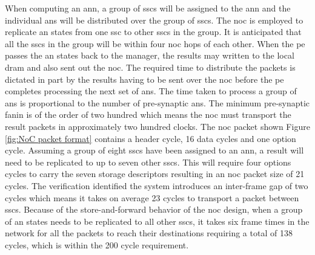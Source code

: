 When computing an \ac{ann}, a group of \acp{ssc} will be assigned to the \ac{ann} and the individual \acp{an} will be distributed over the group of \acp{ssc}.
The \ac{noc} is employed to replicate \ac{an} states from one \ac{ssc} to other \acp{ssc} in the group.
It is anticipated that all the \acp{ssc} in the group will be within four \ac{noc} hops of each other.
When the \ac{pe} passes the \ac{an} states back to the manager, the results may written to the local \ac{dram} and also sent out the \ac{noc}.
The required time to distribute the packets is dictated in part by the results having to be sent over the \ac{noc} before the \ac{pe} completes processing the next set of \acp{an}.
The time taken to process a group of \acp{an} is proportional to the number of pre-synaptic \acp{an}.
The minimum pre-synaptic fanin is of the order of two hundred which means the \ac{noc} must transport the result packets in approximately two hundred clocks.
The \ac{noc} packet shown Figure \ref{fig:NoC packet format} contains a header cycle, 16 data cycles and one option cycle. 
Assuming a group of eight \acp{ssc} have been assigned to an \ac{ann}, a result will need to be replicated to up to seven other \acp{ssc}.
This will require four options cycles to carry the seven storage descriptors resulting in an \ac{noc} packet size of 21 cycles.
The verification identified the system introduces an inter-frame gap of two cycles which means it takes on average 23 cycles to transport a packet between \acp{ssc}.
Because of the store-and-forward behavior of the \ac{noc} design, when a group of \ac{an} states needs to be replicated to all other \acp{ssc}, it takes six frame times in the network for all the packets to reach their destinations
requiring a total of 138 cycles, which is within the 200 cycle requirement.

